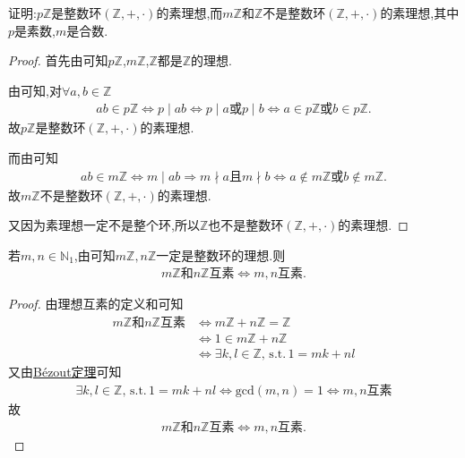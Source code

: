 \documentclass[../../main.tex]{subfiles}
\begin{document}
\begin{proposition}\label{proposition:整数环中的素理想}
证明:$p\mathbb{Z}$是整数环$(\mathbb{Z},+,\cdot)$的素理想,而$m\mathbb{Z}$和$\mathbb{Z}$不是整数环$(\mathbb{Z},+,\cdot)$的素理想,其中$p$是素数,$m$是合数.
\end{proposition}
\begin{proof}
首先由可知$p\mathbb{Z}$,$m\mathbb{Z}$,$\mathbb{Z}$都是$\mathbb{Z}$的理想.

由可知,对$\forall a,b\in \mathbb{Z}$
\begin{align*}
ab\in p\mathbb{Z} \Leftrightarrow p\mid ab\Leftrightarrow p\mid a\text{或}p\mid b\Leftrightarrow a\in p\mathbb{Z} \text{或}b\in p\mathbb{Z} .
\end{align*}
故$p\mathbb{Z}$是整数环$(\mathbb{Z},+,\cdot)$的素理想.

而由可知
\begin{align*}
ab\in m\mathbb{Z} \Leftrightarrow m\mid ab\Rightarrow m\nmid a\text{且}m\nmid b\Leftrightarrow a\notin m\mathbb{Z} \text{或}b\notin m\mathbb{Z} .
\end{align*}
故$m\mathbb{Z}$不是整数环$(\mathbb{Z},+,\cdot)$的素理想.

又因为素理想一定不是整个环,所以$\mathbb{Z}$也不是整数环$(\mathbb{Z},+,\cdot)$的素理想.
\end{proof}

\begin{proposition}
若$m,n\in \mathbb{N}_1$,由可知$m\mathbb{Z},n\mathbb{Z}$一定是整数环的理想.则
\begin{align*}
m\mathbb{Z}\text{和}n\mathbb{Z}\text{互素} \iff m,n\text{互素}.
\end{align*}
\end{proposition}
\begin{proof}
由理想互素的定义和可知
\begin{align*}
m\mathbb{Z} \text{和}n\mathbb{Z} \text{互素}
&\Longleftrightarrow m\mathbb{Z} +n\mathbb{Z} =\mathbb{Z} \\
&\Longleftrightarrow 1\in m\mathbb{Z} +n\mathbb{Z} \\
&\Longleftrightarrow \exists k,l\in \mathbb{Z},\,\mathrm{s}.\mathrm{t}.\,1=mk+nl
\end{align*}
又由\hyperref[lemma:Bézout定理]{Bézout定理}可知
\begin{align*}
\exists k,l\in \mathbb{Z},\,\mathrm{s}.\mathrm{t}.\,1=mk+nl
\Longleftrightarrow \mathrm{gcd}(m,n) = 1 
\Longleftrightarrow m,n\text{互素}
\end{align*}
故
\begin{align*}
m\mathbb{Z} \text{和}n\mathbb{Z} \text{互素} \Longleftrightarrow m,n\text{互素}.
\end{align*}
\end{proof}
\end{document}

